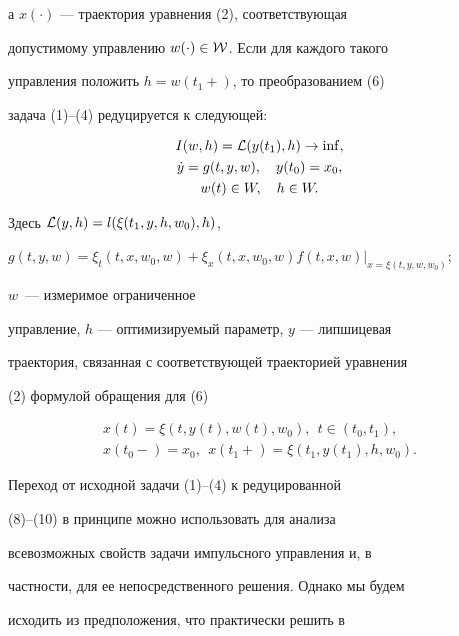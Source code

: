 а $x(\cdot)$ --- траектория уравнения (2), соответствующая 


допустимому управлению $w(\cdot)\in{\cal W}$. Если для каждого такого


управления положить $h=w(t_1+)$, то преобразованием (6)


задача (1)--(4) редуцируется к следующей:


\begin{gather}


I(w,h)={\cal L}(y(t_1),h) \to \inf,\\


\Dot{y}=g(t,y,w), \quad y(t_0)=x_0,\\


w(t)\in W, \quad h\in W.


\end{gather}


Здесь ${\cal L}(y,h)=l(\xi(t_1,y,h,w_0),h)$, 


$g(t,y,w)=\xi_t(t,x,w_0,w)+\xi_x(t,x,w_0,w)


f(t,x,w)|_{x=\xi(t,y,w,w_0)}$;


$w$~--- измеримое ограниченное 


управление, $h$ --- оптимизируемый параметр, $y$ --- липшицевая 


траектория, связанная с соответствующей траекторией уравнения


(2) формулой обращения для (6)


\begin{equation}


\begin{array}{c}


x(t)=\xi(t,y(t),w(t),w_0), \ \ t\in(t_0,t_1),\\[2mm]


x(t_0-)=x_0,\ \ x(t_1+)=\xi(t_1,y(t_1),h,w_0).


\end{array}


\end{equation}


 


Переход от исходной задачи (1)--(4) к редуцированной


(8)--(10) в принципе можно использовать для анализа 


всевозможных свойств задачи импульсного управления и, в 


частности, для ее непосредственного решения. Однако мы будем


исходить из предположения, что практически решить в 


